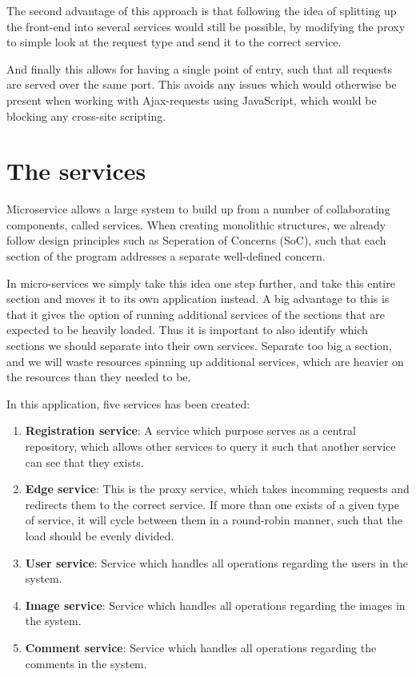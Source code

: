 \documentclass[a4paper,11pt,oneside]{book}
\begin{document}
The second advantage of this approach is that following the idea of splitting up the front-end into several services would still be possible, by modifying the proxy to simple look at the request type and send it to the correct service.

And finally this allows for having a single point of entry, such that all requests are served over the same port. This avoids any issues which would otherwise be present when working with Ajax-requests using JavaScript, which would be blocking any cross-site scripting. 


\section{The services}
Microservice allows a large system to build up from a number of collaborating components, called services. When creating monolithic structures, we already follow design principles such as Seperation of Concerns (SoC), such that each section of the program addresses a separate well-defined concern.

In micro-services we simply take this idea one step further, and take this entire section and moves it to its own application instead. A big advantage to this is that it gives the option of running additional services of the sections that are expected to be heavily loaded. Thus it is important to also identify which sections we should separate into their own services. Separate too big a section, and we will waste resources spinning up additional services, which are heavier on the resources than they needed to be.

In this application, five services has been created:
\begin{enumerate}
\item \textbf{Registration service}: A service which purpose serves as a central repository, which allows other services to query it such that another service can see that they exists.
\item \textbf{Edge service}: This is the proxy service, which takes incomming requests and redirects them to the correct service. If more than one exists of a given type of service, it will cycle between them in a round-robin manner, such that the load should be evenly divided.
\item \textbf{User service}: Service which handles all operations regarding the users in the system.
\item \textbf{Image service}: Service which handles all operations regarding the images in the system.
\item \textbf{Comment service}: Service which handles all operations regarding the comments in the system.
\end{enumerate}
\end{document}

